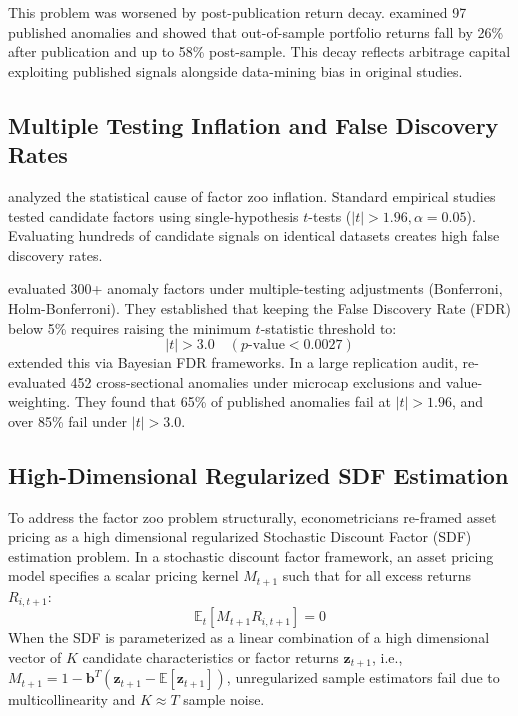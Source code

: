 This problem was worsened by post-publication return decay. \citet{mclean2016does} examined 97 published anomalies and showed that out-of-sample portfolio returns fall by 26\% after publication and up to 58\% post-sample. This decay reflects arbitrage capital exploiting published signals alongside data-mining bias in original studies.

\subsection{Multiple Testing Inflation and False Discovery Rates}
\citet{harvey2016and} analyzed the statistical cause of factor zoo inflation. Standard empirical studies tested candidate factors using single-hypothesis $t$-tests ($|t| > 1.96, \alpha = 0.05$). Evaluating hundreds of candidate signals on identical datasets creates high false discovery rates.

\citet{harvey2016and} evaluated 300+ anomaly factors under multiple-testing adjustments (Bonferroni, Holm-Bonferroni). They established that keeping the False Discovery Rate (FDR) below 5\% requires raising the minimum $t$-statistic threshold to:
\begin{equation}
|t| > 3.0 \quad (p \text{-value} < 0.0027)
\label{eq:ch2_harvey_threshold}
\end{equation}
\citet{harvey2020false} extended this via Bayesian FDR frameworks. In a large replication audit, \citet{hou2020replicating} re-evaluated 452 cross-sectional anomalies under microcap exclusions and value-weighting. They found that 65\% of published anomalies fail at $|t| > 1.96$, and over 85\% fail under $|t| > 3.0$.

\subsection{High-Dimensional Regularized SDF Estimation}
To address the factor zoo problem structurally, econometricians re-framed asset pricing as a high dimensional regularized Stochastic Discount Factor (SDF) estimation problem. In a stochastic discount factor framework, an asset pricing model specifies a scalar pricing kernel $M_{t+1}$ such that for all excess returns $R_{i,t+1}$:
\begin{equation}
\mathbb{E}_t \left[ M_{t+1} R_{i,t+1} \right] = 0
\label{eq:ch2_sdf_fundamental}
\end{equation}
When the SDF is parameterized as a linear combination of a high dimensional vector of $K$ candidate characteristics or factor returns $\mathbf{z}_{t+1}$, i.e., $M_{t+1} = 1 - \mathbf{b}^T (\mathbf{z}_{t+1} - \mathbb{E}[\mathbf{z}_{t+1}])$, unregularized sample estimators fail due to multicollinearity and $K \approx T$ sample noise.

